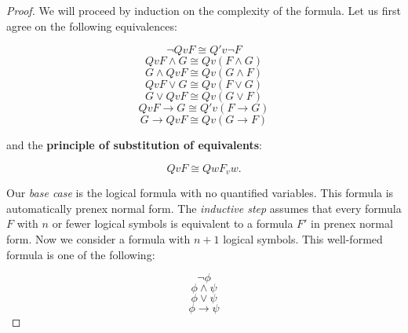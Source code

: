 \documentclass[a4paper,11pt]{article}
\begin{document}
	
	\begin{proof}
		We will proceed by induction on the complexity of the formula. 
		Let us first agree on the following equivalences:
		
		\begin{equation} \lnot Qv F \cong Q'v \lnot F \end{equation}
		\begin{equation} Qv F \land G \cong Qv(F \land G) \end{equation}
		\begin{equation} G \land Qv F \cong Qv(G \land F) \end{equation}	
		\begin{equation} Qv F \lor G \cong Qv(F \lor G) \end{equation}
		\begin{equation} G \lor Qv F \cong Qv(G \lor F) \end{equation}
		\begin{equation} Qv F  \rightarrow G \cong Q'v(F \rightarrow G) \end{equation}
		\begin{equation} G \rightarrow Qv F \cong Qv(G \rightarrow F) \end{equation}
		
		\bigskip
		
		and the \textbf{principle of substitution of equivalents}:
		
		\begin{equation} Qv F \cong Qw F_{v} w. \end{equation}
		
		\bigskip
		
		Our \textit{base case} is the logical formula with no quantified variables. This formula
		is automatically prenex normal form. The \textit{inductive step} assumes that every formula $F$
		with $n$ or fewer logical symbols is equivalent to a formula $F'$ in prenex normal form. 
		Now we consider a formula with $n + 1$ logical symbols. This well-formed formula is
		one of the following:
		
		\begin{equation*} \lnot \phi \end{equation*}
		\begin{equation*} \phi \land \psi \end{equation*}
		\begin{equation*} \phi \lor \psi \end{equation*}
		\begin {equation*} \phi \rightarrow \psi \end{equation*}
		

\end{proof}
\end{document}
